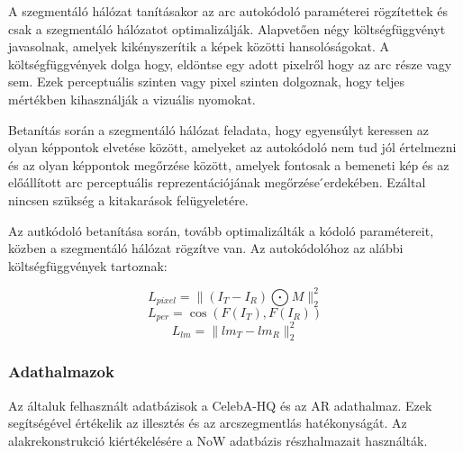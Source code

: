 \documentclass[12pt,a4]{article}
\begin{document}
 	A szegmentáló hálózat tanításakor az arc autokódoló paraméterei
 	rögzítettek és csak a szegmentáló hálózatot optimalizálják. Alapvetően négy költségfüggvényt javasolnak, amelyek
 	kikényszerítik a képek közötti hansolóságokat. A költségfüggvények dolga
 	hogy, eldöntse egy adott pixelről hogy az arc része vagy sem. Ezek
    perceptuális szinten vagy pixel szinten dolgoznak, hogy teljes mértékben
 	kihasználják a vizuális nyomokat.
 	
 	Betanítás során a szegmentáló hálózat feladata, hogy egyensúlyt
 	keressen az olyan képpontok elvetése között, amelyeket az autokódoló nem
 	tud jól értelmezni és az olyan képpontok megőrzése között, amelyek fontosak
 	a bemeneti kép és az előállított arc perceptuális reprezentációjának megőrzése
 	́erdekében. Ezáltal nincsen szükség a kitakarások felügyeletére.
 	
 	Az autkódoló betanítása során, tovább optimalizálták a kódoló paramétereit, közben a szegmentáló hálózat rögzítve van. Az autokódolóhoz az alábbi költségfüggvények tartoznak:

    \begin{equation*}
    L_{pixel} = \parallel (I_{T} − I_{R}) \bigodot M \parallel _{2}^{2} 
    \end{equation*}
    \begin{equation*}
    L_{per} = \cos(F(I_{T}), F(I_{R}))    
    \end{equation*}
    \begin{equation*}
    L_{lm} = \parallel lm_{T} - lm_{R} \parallel _{2}^{2}  
    \end{equation*}

 	\subsubsection{Adathalmazok}
 	Az általuk felhasznált adatbázisok a CelebA-HQ és az AR adathalmaz.
 	Ezek segítségével értékelik az illesztés és az arcszegmentlás hatékonyságát.
 	Az alakrekonstrukció kiértékelésére a NoW adatbázis
 	részhalmazait használták.
 	
\end{document}
